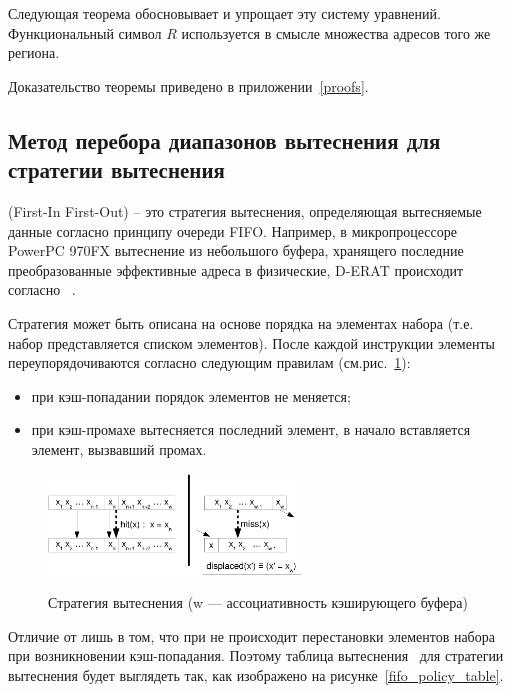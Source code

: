 Следующая теорема обосновывает и упрощает эту систему уравнений.
Функциональный символ $R$ используется в смысле множества адресов
того же региона.
\begin{theorem}\label{LRU_equation} \DiapazonLRU
\end{theorem}

Доказательство теоремы приведено в приложении~\ref{proofs}.

\subsection{Метод перебора диапазонов вытеснения для стратегии
вытеснения \FIFO}

\FIFO (First-In First-Out) -- это стратегия вытеснения, определяющая
вытесняемые данные согласно принципу очереди FIFO. Например, в
микропроцессоре PowerPC 970FX вытеснение из небольшого буфера,
хранящего последние преобразованные эффективные адреса в физические,
D-ERAT происходит согласно \FIFO~\cite{PowerPC970FXUserManual}.

Стратегия \FIFO может быть описана на основе порядка на элементах
набора (т.е. набор представляется списком элементов). После каждой
инструкции элементы переупорядочиваются согласно следующим правилам
(см.рис.~\ref{fifo1}):
\begin{itemize}
\item при кэш-попадании порядок элементов не меняется;
\item при кэш-промахе вытесняется последний элемент, в начало
вставляется элемент, вызвавший промах.
\end{itemize}

\begin{figure}[h] \center
  \includegraphics[width=0.6\textwidth]{2.theor/fifo1}\\
  \caption{Стратегия вытеснения \FIFO (w --- ассоциативность
  кэширующего буфера)}\label{fifo1}
\end{figure}

Отличие от \LRU лишь в том, что при \FIFO не происходит перестановки
элементов набора при возникновении кэш-попадания. Поэтому таблица
вытеснения~\cite{policy_tables} для стратегии вытеснения \FIFO будет
выглядеть так, как изображено на рисунке~\ref{fifo_policy_table}.

